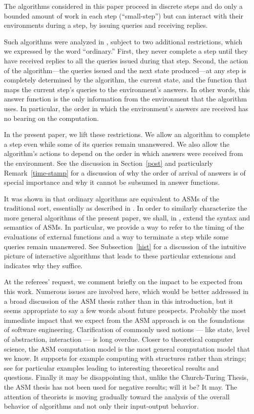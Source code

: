 \documentclass{LMCS}
\theoremstyle{definition}
\begin{document}
The algorithms considered in this paper proceed in discrete steps and
do only a bounded amount of work in each step (``small-step'') but can
interact with their environments during a step, by issuing queries and
receiving replies.

Such algorithms were analyzed in \cite{oa1, oa2, oa3}, subject to two
additional restrictions, which we expressed by the word ``ordinary.''
First, they never complete a step until they have received replies to
all the queries issued during that step. Second, the action of the
algorithm---the queries issued and the next state produced---at any
step is completely determined by the algorithm, the current state, and
the function that maps the current step's queries to the environment's
answers. In other words, this answer function is the only information
from the environment that the algorithm uses.  In particular, the
order in which the environment's answers are received has no bearing
on the computation.

In the present paper, we lift these restrictions.  We allow an algorithm
to complete a step even while some of its queries remain unanswered.  We
also allow the algorithm's actions to depend on the order in which answers
were received from the environment.  See the discussion in
Section~\ref{post} and particularly Remark~\ref{time-stamp} for a
discussion of why the order of arrival of answers is of special importance
and why it cannot be subsumed in answer functions.

It was shown in \cite{oa3} that ordinary algorithms are equivalent to ASMs
of the traditional sort, essentially as described in \cite{lipari}.  In
order to similarly characterize the more general algorithms of the present
paper, we shall, in \cite{ga2}, extend the syntax and semantics of ASMs.
In particular, we provide a way to refer to the timing of the evaluations
of external functions and a way to terminate a step while some queries
remain unanswered.  See Subsection~\ref{hist} for a discussion of the
intuitive picture of interactive algorithms that leads to these particular
extensions and indicates why they suffice.

At the referees' request, we comment briefly on the impact to be
expected from this work.  Numerous issues are involved here, which
would be better addressed in a broad discussion of the ASM thesis
rather than in this introduction, but it seems appropriate to say a
few words about future prospects.  Probably the most immediate impact
that we expect from the ASM approach is on the foundations of software
engineering.  Clarification of commonly used notions --- like state,
level of abstraction, interaction --- is long overdue.  Closer to
theoretical computer science, the ASM computation model is the most
general computation model that we know.  It supports for example
computing with structures rather than strings; see \cite{unord} for
particular examples leading to interesting theoretical results and
questions.  Finally it may be disappointing that, unlike the
Church-Turing Thesis, the ASM thesis has not been used for negative
results; will it be?  It may.  The attention of theorists is moving
gradually toward the analysis of the overall behavior of algorithms
and not only their input-output behavior.
\end{document}
